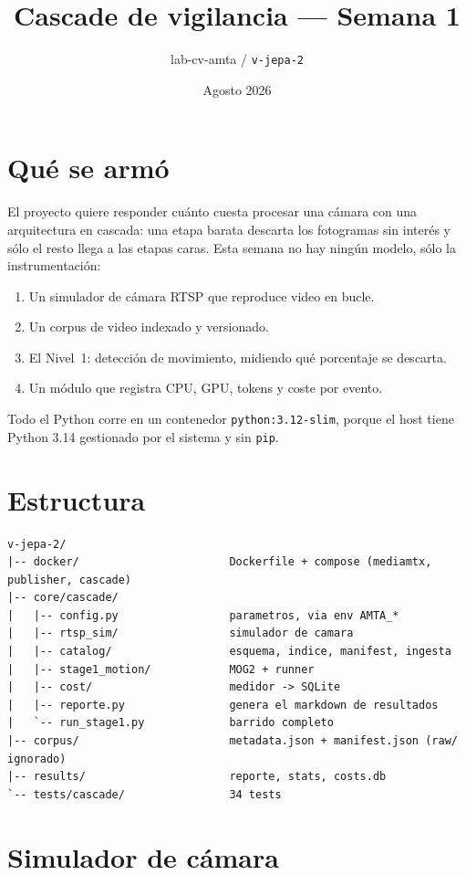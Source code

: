 \documentclass[11pt,a4paper]{article}
\title{\vspace{-1.2cm}Cascade de vigilancia --- Semana 1}
\author{lab-cv-amta / \texttt{v-jepa-2}}
\date{Agosto 2026}
\begin{document}
\maketitle

\section{Qué se armó}

El proyecto quiere responder cuánto cuesta procesar una cámara con una
arquitectura en cascada: una etapa barata descarta los fotogramas sin interés y
sólo el resto llega a las etapas caras. Esta semana no hay ningún modelo, sólo
la instrumentación:

\begin{enumerate}[leftmargin=*]
  \item Un simulador de cámara RTSP que reproduce video en bucle.
  \item Un corpus de video indexado y versionado.
  \item El Nivel~1: detección de movimiento, midiendo qué porcentaje se descarta.
  \item Un módulo que registra CPU, GPU, tokens y coste por evento.
\end{enumerate}

Todo el Python corre en un contenedor \texttt{python:3.12-slim}, porque el host
tiene Python 3.14 gestionado por el sistema y sin \texttt{pip}.

\section{Estructura}

\begin{lstlisting}
v-jepa-2/
|-- docker/                       Dockerfile + compose (mediamtx, publisher, cascade)
|-- core/cascade/
|   |-- config.py                 parametros, via env AMTA_*
|   |-- rtsp_sim/                 simulador de camara
|   |-- catalog/                  esquema, indice, manifest, ingesta
|   |-- stage1_motion/            MOG2 + runner
|   |-- cost/                     medidor -> SQLite
|   |-- reporte.py                genera el markdown de resultados
|   `-- run_stage1.py             barrido completo
|-- corpus/                       metadata.json + manifest.json (raw/ ignorado)
|-- results/                      reporte, stats, costs.db
`-- tests/cascade/                34 tests
\end{lstlisting}

\section{Simulador de cámara}
\end{document}
